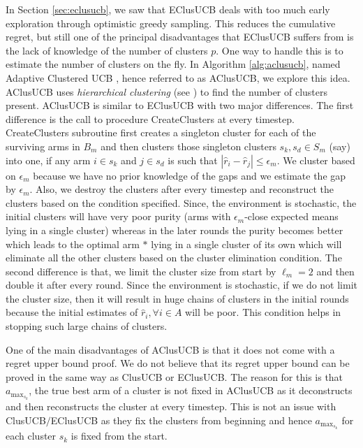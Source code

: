 In Section \ref{sec:eclusucb}, we saw that EClusUCB deals with too much early exploration through optimistic greedy sampling. This reduces the cumulative regret, but still one of the principal disadvantages that EClusUCB suffers from is the lack of knowledge of the number of clusters $p$. One way to handle this is to estimate the number of clusters on the fly. In Algorithm \ref{alg:aclusucb}, named Adaptive Clustered UCB , hence referred to as AClusUCB, we explore this idea. AClusUCB uses \emph{hierarchical clustering} (see \citet{friedman2001elements}) to find the number of clusters present. AClusUCB is similar to EClusUCB with two major differences. The first difference is the call to procedure CreateClusters at every timestep. CreateClusters subroutine first creates a singleton cluster for each of the surviving arms in $B_{m}$ and then clusters those singleton clusters $s_{k}, s_{d}\in S_{m}$ (say) into one, if any arm $i\in s_{k}$ and $j\in s_{d}$ is such that $|\hat{r}_{i}-\hat{r}_{j}|\leq \epsilon_{m}$. We cluster based on $\epsilon_{m}$ because we have no prior knowledge of the gaps and we estimate the gap by $\epsilon_{m}$. Also, we destroy the clusters after every timestep and reconstruct the clusters based on the condition specified. Since, the environment is stochastic, the initial clusters will have very poor purity (arms with $\epsilon_{m}$-close expected means lying in a single cluster) whereas in the later rounds the purity becomes better which leads to the optimal arm $*$ lying in a single cluster of its own which will eliminate all the other clusters based on the cluster elimination condition. The second difference is that, we limit the cluster size from start by $\ell_{m}=2$ and then double it after every round. Since the environment is stochastic, if we do not limit the cluster size, then it will result in huge chains of clusters in the initial rounds because the initial estimates of $\hat{r}_{i},\forall i\in A$ will be poor. This condition helps in stopping such large chains of clusters.  

One of the main disadvantages of AClusUCB is that it does not come with a regret upper bound proof. We do not believe that its regret upper bound can be proved in the same way as ClusUCB or EClusUCB. The reason for this is that $a_{\max_{s_{k}}}$, the true best arm of a cluster is not fixed in AClusUCB as it deconstructs and then reconstructs the cluster at every timestep. This is not an issue with ClusUCB$\big /$EClusUCB as they fix the clusters from beginning and hence $a_{\max_{s_{k}}}$ for each cluster $s_k$ is fixed from the start.

